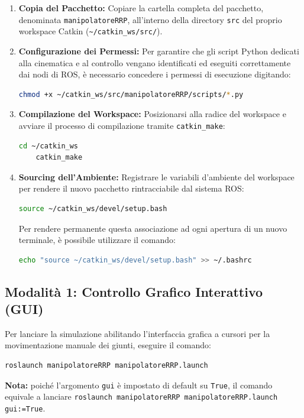 \documentclass[11pt, a4paper]{report}
\begin{document}
\begin{enumerate}
    \item \textbf{Copia del Pacchetto:} Copiare la cartella completa del pacchetto, denominata \texttt{manipolatoreRRP}, all'interno della directory \texttt{src} del proprio workspace Catkin (\texttt{\textasciitilde/catkin\_ws/src/}).

    \item \textbf{Configurazione dei Permessi:} Per garantire che gli script Python dedicati alla cinematica e al controllo vengano identificati ed eseguiti correttamente dai nodi di ROS, è necessario concedere i permessi di esecuzione digitando:
    \begin{lstlisting}[language=bash]
    chmod +x ~/catkin_ws/src/manipolatoreRRP/scripts/*.py
    \end{lstlisting}

    \item \textbf{Compilazione del Workspace:} Posizionarsi alla radice del workspace e avviare il processo di compilazione tramite \texttt{catkin\_make}:
    \begin{lstlisting}[language=bash]
    cd ~/catkin_ws
    catkin_make
    \end{lstlisting}

    \item \textbf{Sourcing dell'Ambiente:} Registrare le variabili d'ambiente del workspace per rendere il nuovo pacchetto rintracciabile dal sistema ROS:
    \begin{lstlisting}[language=bash]
    source ~/catkin_ws/devel/setup.bash
    \end{lstlisting}
    Per rendere permanente questa associazione ad ogni apertura di un nuovo terminale, è possibile utilizzare il comando:
    \begin{lstlisting}[language=bash]
    echo "source ~/catkin_ws/devel/setup.bash" >> ~/.bashrc
    \end{lstlisting}
\end{enumerate}

\newpage
\subsection{Modalità 1: Controllo Grafico Interattivo (GUI)}
Per lanciare la simulazione abilitando l'interfaccia grafica a cursori per la movimentazione manuale dei giunti, eseguire il comando:
\begin{lstlisting}[language=bash]
roslaunch manipolatoreRRP manipolatoreRRP.launch
\end{lstlisting}
\textbf{Nota:} poiché l'argomento \texttt{gui} è impostato di default su \texttt{True}, il comando equivale a lanciare \texttt{roslaunch manipolatoreRRP manipolatoreRRP.launch gui:=True}.
\end{document}
